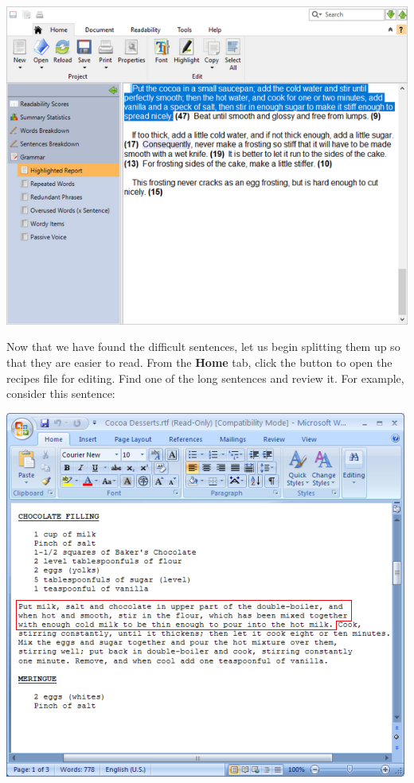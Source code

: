 \documentclass[
]{book}
\theoremstyle{definition}
\theoremstyle{definition}
\theoremstyle{definition}
\theoremstyle{definition}
\theoremstyle{remark}
\begin{document}
\includegraphics{Images/longsentenceselected.png}

Now that we have found the difficult sentences, let us begin splitting them up so that they are easier to read. From the \textbf{Home} tab, click the  button to open the recipes file for editing. Find one of the long sentences and review it. For example, consider this sentence:

\includegraphics{Images/NonGenerated/sentencetoimprove.png}
\end{document}
